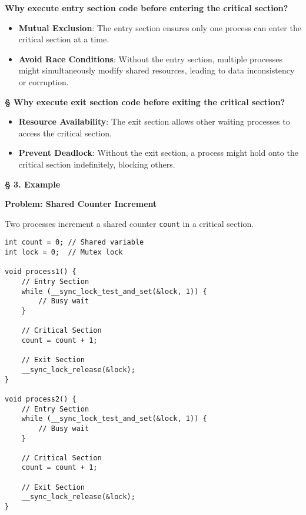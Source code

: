 \documentclass[a4paper]{book}
\newcommand{\sfbf}[1]{{\normalsize\textsf{\textbf{§ #1}}}}
\begin{document}
\textbf{Why execute entry section code before entering the critical section?}

\begin{itemize}
\item 
\textbf{Mutual Exclusion}: The entry section ensures only one process can enter the critical section at a time.

\item 
\textbf{Avoid Race Conditions}: Without the entry section, multiple processes might simultaneously modify shared resources, leading to data inconsistency or corruption.

\end{itemize}

\sfbf{Why execute exit section code before exiting the critical section?}

\begin{itemize}
\item 
\textbf{Resource Availability}: The exit section allows other waiting processes to access the critical section.

\item 
\textbf{Prevent Deadlock}: Without the exit section, a process might hold onto the critical section indefinitely, blocking others.

\end{itemize}

\hrulefill

\sfbf{3. Example}

\textbf{Problem: Shared Counter Increment}

Two processes increment a shared counter \verb|count| in a critical section.

\begin{verbatim}
int count = 0; // Shared variable
int lock = 0;  // Mutex lock

void process1() {
    // Entry Section
    while (__sync_lock_test_and_set(&lock, 1)) {
        // Busy wait
    }
    
    // Critical Section
    count = count + 1;

    // Exit Section
    __sync_lock_release(&lock);
}

void process2() {
    // Entry Section
    while (__sync_lock_test_and_set(&lock, 1)) {
        // Busy wait
    }
    
    // Critical Section
    count = count + 1;

    // Exit Section
    __sync_lock_release(&lock);
}
\end{verbatim}
\end{document}
